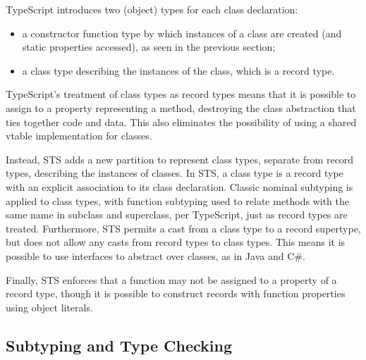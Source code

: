 TypeScript introduces two (object) types for each class declaration:
\begin{itemize}
\item a constructor function type by which instances of a class
are created (and static properties accessed), as seen in the previous section; 
\item a class type describing the instances of the class, which is a record type.
\end{itemize}
TypeScript's treatment of class types as record types
means that it is possible to assign to a property representing a method, 
destroying the class abstraction that ties together code and data. 
This also eliminates the possibility of using a shared vtable implementation for classes.

Instead, STS adds a new partition to represent class types, separate from record types, 
describing the instances of classes. In STS, a class type is a 
record type with an explicit association to its class declaration.
Classic nominal subtyping is applied to class types, with function subtyping used to relate methods with 
the same name in subclass and superclass, per TypeScript, just as record types are treated.
Furthermore, STS permits a cast from a class type
to a record supertype, but does not allow any casts from record types to class types. This means
it is possible to use interfaces to abstract over classes, as in Java and C\#. 

Finally, STS enforces that a function may not be assigned to a property of a record type, 
though it is possible to construct records with function properties using object literals. 

\subsection{Subtyping and Type Checking}

